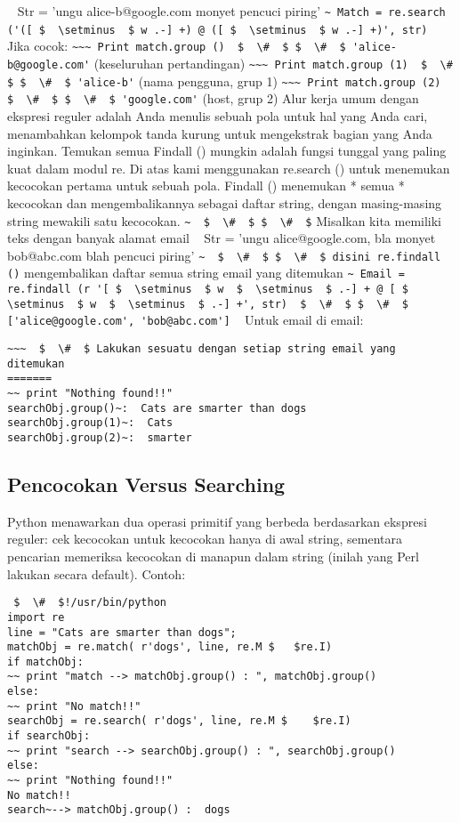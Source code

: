 \begin {enumerate}
\begin {enumerate}
~ Str = 'ungu alice-b@google.com monyet pencuci piring'
\verb|~ Match = re.search ('([ $  \setminus  $ w .-] +) @ ([ $  \setminus  $ w .-] +)', str)|
~ Jika cocok:
\verb|~~~ Print match.group ()  $  \#  $ $  \#  $ 'alice-b@google.com'| (keseluruhan pertandingan)
\verb|~~~ Print match.group (1)  $  \#  $ $  \#  $ 'alice-b'| (nama pengguna, grup 1)
\verb|~~~ Print match.group (2)  $  \#  $ $  \#  $ 'google.com'| (host, grup 2)
Alur kerja umum dengan ekspresi reguler adalah Anda menulis sebuah pola untuk hal yang Anda cari, menambahkan kelompok tanda kurung untuk mengekstrak bagian yang Anda inginkan. Temukan semua Findall () mungkin adalah fungsi tunggal yang paling kuat dalam modul re. Di atas kami menggunakan re.search () untuk menemukan kecocokan pertama untuk sebuah pola. Findall () menemukan * semua * kecocokan dan mengembalikannya sebagai daftar string, dengan masing-masing string mewakili satu kecocokan.
\verb|~  $  \#  $ $  \#  $| Misalkan kita memiliki teks dengan banyak alamat email
~ Str = 'ungu alice@google.com, bla monyet bob@abc.com blah pencuci piring'
\verb|~  $  \#  $ $  \#  $ disini re.findall ()| mengembalikan daftar semua string email yang ditemukan
\verb|~ Email = re.findall (r '[ $  \setminus  $ w  $  \setminus  $ .-] + @ [ $  \setminus  $ w  $  \setminus  $ .-] +', str)  $  \#  $ $  \#  $ ['alice@google.com', 'bob@abc.com']|
~ Untuk email di email:
\begin{verbatim}
~~~  $  \#  $ Lakukan sesuatu dengan setiap string email yang ditemukan
=======
~~ print "Nothing found!!"
searchObj.group()~:  Cats are smarter than dogs
searchObj.group(1)~:  Cats
searchObj.group(2)~:  smarter
\end{verbatim}
\subsection{Pencocokan Versus Searching}
Python menawarkan dua operasi primitif yang berbeda berdasarkan ekspresi reguler: cek kecocokan untuk kecocokan hanya di awal string, sementara pencarian memeriksa kecocokan di manapun dalam string (inilah yang Perl lakukan secara default).
Contoh:
\begin{verbatim}
 $  \#  $!/usr/bin/python
import re
line = "Cats are smarter than dogs";
matchObj = re.match( r'dogs', line, re.M $   $re.I)
if matchObj:
~~ print "match --> matchObj.group() : ", matchObj.group()
else:
~~ print "No match!!"
searchObj = re.search( r'dogs', line, re.M $    $re.I)
if searchObj:
~~ print "search --> searchObj.group() : ", searchObj.group()
else:
~~ print "Nothing found!!"
No match!!
search~--> matchObj.group() :  dogs
\end{verbatim}

\end{enumerate}
\end{enumerate}
